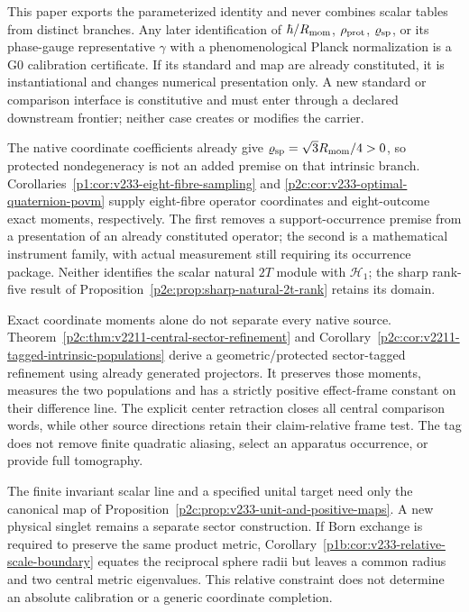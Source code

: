 \documentclass[12pt,a4paper]{article}
\begin{document}
This paper exports the parameterized identity and never combines scalar
tables from distinct branches.  Any later identification of
\(\hbar/R_{\mathrm{mom}}\), \(\rho_{\rm prot}\), \(\varrho_{\rm sp}\), or its
phase-gauge representative \(\gamma\) with a phenomenological Planck
normalization is a G0 calibration certificate.  If its standard and map are
already constituted, it is instantiational and changes numerical presentation
only.  A new standard or comparison interface is constitutive and must enter
through a declared downstream frontier; neither case creates or modifies the
carrier.

\begin{remark}
\label{p2e:rem:v233-geometry-export-boundary}
The native coordinate coefficients already give
\(\varrho_{\rm sp}=\sqrt3R_{\mathrm{mom}}/4>0\), so protected nondegeneracy
is not an added premise on that intrinsic branch.
Corollaries~\ref{p1:cor:v233-eight-fibre-sampling} and
\ref{p2c:cor:v233-optimal-quaternion-povm} supply eight-fibre
operator coordinates and eight-outcome exact moments, respectively.
The first removes a support-occurrence premise from a presentation
of an already constituted operator; the second is a mathematical
instrument family, with actual measurement still requiring its
occurrence package. Neither identifies the scalar natural
\(2T\) module with \(\mathcal H_1\); the sharp rank-five result
of Proposition~\ref{p2e:prop:sharp-natural-2t-rank} retains its domain.

Exact coordinate moments alone do not separate every native source.
Theorem~\ref{p2c:thm:v2211-central-sector-refinement} and
Corollary~\ref{p2c:cor:v2211-tagged-intrinsic-populations} derive a
geometric/protected sector-tagged refinement using already generated
projectors.  It preserves those moments, measures the two populations and
has a strictly positive effect-frame constant on their difference line.
The explicit center retraction closes all central comparison words, while
other source directions retain their claim-relative frame test.  The tag
does not remove finite quadratic aliasing, select an apparatus occurrence,
or provide full tomography.

The finite invariant scalar line and a specified unital target need
only the canonical map of
Proposition~\ref{p2c:prop:v233-unit-and-positive-maps}.
A new physical singlet remains a separate sector construction.
If Born exchange is required to preserve the same product metric,
Corollary~\ref{p1b:cor:v233-relative-scale-boundary} equates
the reciprocal sphere radii but leaves a common radius and two
central metric eigenvalues. This relative constraint does not
determine an absolute calibration or a generic coordinate completion.
\end{remark}
\end{document}
